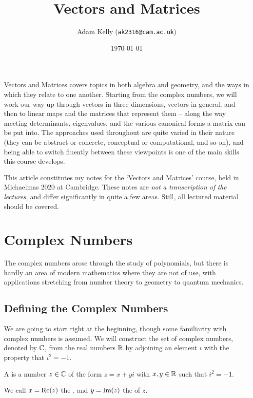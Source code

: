 \documentclass[a4paper]{scrartcl}
\title{Vectors and Matrices}
\author{Adam Kelly (\texttt{ak2316@cam.ac.uk})}
\date{\today}
\begin{document}
\maketitle

Vectors and Matrices covers topics in both algebra and geometry, and the ways in which they relate to one another. Starting from the complex numbers, we will work our way up through vectors in three dimensions, vectors in general, and then to linear maps and the matrices that represent them -- along the way meeting determinants, eigenvalues, and the various canonical forms a matrix can be put into. The approaches used throughout are quite varied in their nature (they can be abstract or concrete, conceptual or computational, and so on), and being able to switch fluently between these viewpoints is one of the main skills this course develops.

This article constitutes my notes for the `Vectors and Matrices' course, held in Michaelmas 2020 at Cambridge. These notes are \emph{not a transcription of the lectures}, and differ significantly in quite a few areas. Still, all lectured material should be covered.

\tableofcontents



\section{Complex Numbers}

The complex numbers arose through the study of polynomials, but there is hardly an area of modern mathematics where they are not of use, with applications stretching from number theory to geometry to quantum mechanics.


\subsection{Defining the Complex Numbers}

We are going to start right at the beginning, though some familiarity with complex numbers is assumed.
We will construct the set of complex numbers, denoted by $\mathbb{C}$, from the real numbers $\mathbb{R}$ by adjoining an element $i$ with the property that $i^2 = -1$.

\begin{definition}
	A  is a number $z \in \mathbb{C}$ of the form $z = x + yi$ with $x, y \in \mathbb{R}$ such that $i^2 = -1$. 
	
	We call $x = \operatorname{Re}(z)$ the , and $y = \operatorname{Im}(z)$ the  of $z$.
\end{definition}
\end{document}
